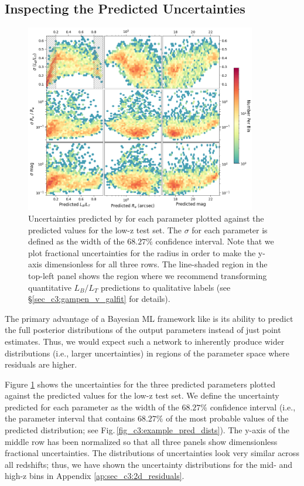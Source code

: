 \subsection{Inspecting the Predicted Uncertainties} \label{sec_c3:uncertainties}

\begin{figure}[htb]
    \centering
    \includegraphics[width = 0.9\textwidth]{2d_uncer_low_z.png}
    \caption{Uncertainties predicted by \gampen{} for each parameter plotted against the predicted values for the low-z test set. The $\sigma$ for each parameter is defined as the width of the $68.27\%$ confidence interval. Note that we plot fractional uncertainties for the radius in order to make the y-axis dimensionless for all three rows. The line-shaded region in the top-left panel shows the region where we recommend transforming quantitative $L_B/L_T$ predictions to qualitative labels (see \S \ref{sec_c3:gampen_v_galfit} for details).}
    \label{fig_c3:2d_uncer_low_z}
\end{figure}

The primary advantage of a Bayesian ML framework like \gampen{} is its ability to predict the full posterior distributions of the output parameters instead of just point estimates. Thus, we would expect such a network to inherently produce wider distributions (i.e., larger uncertainties) in regions of the parameter space where residuals are higher. 

Figure \ref{fig_c3:2d_uncer_low_z} shows the uncertainties for the three predicted parameters plotted against the predicted values for the low-z test set. We define the uncertainty predicted for each parameter as the width of the $68.27\%$ confidence interval (i.e., the parameter interval that contains $68.27\%$ of the most probable values of the predicted distribution; see Fig.\,\ref{fig_c3:example_pred_dists}). The y-axis of the middle row has been normalized so that all three panels show dimensionless fractional uncertainties. The distributions of uncertainties look very similar across all redshifts; thus, we have shown the uncertainty distributions for the mid- and high-z bins in Appendix \ref{ap:sec_c3:2d_residuals}.

